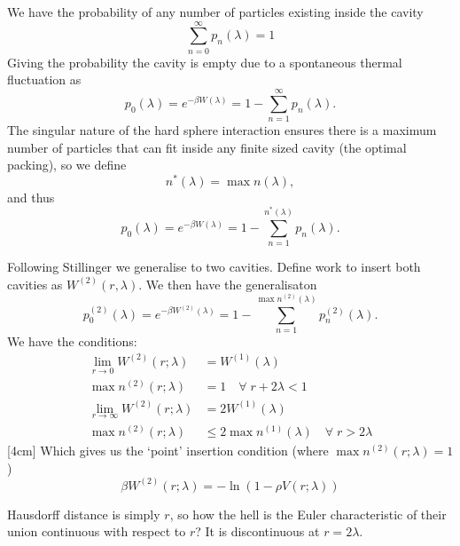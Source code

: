 \documentclass[11pt]{report}
\begin{document}
We have the probability of any number of particles existing inside the cavity
\begin{equation}
  \sum_{n=0}^\infty p_n (\lambda) = 1
\end{equation}
Giving the probability the cavity is empty due to a spontaneous thermal fluctuation
as
\begin{equation}
  p_0 (\lambda) = e^{-\beta W(\lambda)}
  = 1 - \sum_{n=1}^\infty p_n (\lambda).
\end{equation}
The singular nature of the hard sphere interaction ensures there is a maximum number of particles that can fit inside any finite sized cavity (the optimal packing), so we define
\begin{equation}
  n^*(\lambda) = \max{n(\lambda)},
\end{equation}
and thus
\begin{equation}
  p_0 (\lambda) = e^{-\beta W(\lambda)}
  = 1 - \sum_{n=1}^{n^*(\lambda)} p_n (\lambda).
\end{equation}

Following Stillinger we generalise to two cavities.
Define work to insert both cavities as $W^{(2)}(r,\lambda)$.
We then have the generalisaton
\begin{equation}
  p_0^{(2)} (\lambda) = e^{-\beta W^{(2)}(\lambda)}
  = 1 - \sum_{n=1}^{\max{n^{(2)}(\lambda)}} p_n^{(2)} (\lambda).
\end{equation}
We have the conditions:%
\begin{align}
  \lim_{r \to 0} W^{(2)}(r; \lambda) &= W^{(1)}(\lambda) \\
  \max{n^{(2)}(r; \lambda)} &= 1
  \quad \forall \; r + 2\lambda < 1 \\
  \lim_{r \to \infty} W^{(2)}(r; \lambda) &= 2 W^{(1)}(\lambda) \\
  \max{n^{(2)}(r; \lambda)} &\le 2 \max{n^{(1)}(\lambda)}
  \quad \forall \; r > 2\lambda
\end{align}
[4cm]
Which gives us the `point' insertion condition (where $\max{n^{(2)}(r; \lambda)} = 1$)
\begin{equation}
  \beta W^{(2)}(r; \lambda) = -\ln (1 - \rho V(r; \lambda))
\end{equation}

Hausdorff distance is simply $r$, so how the hell is the Euler characteristic of their union continuous with respect to $r$? It is discontinuous at $r = 2\lambda$.
\end{document}

